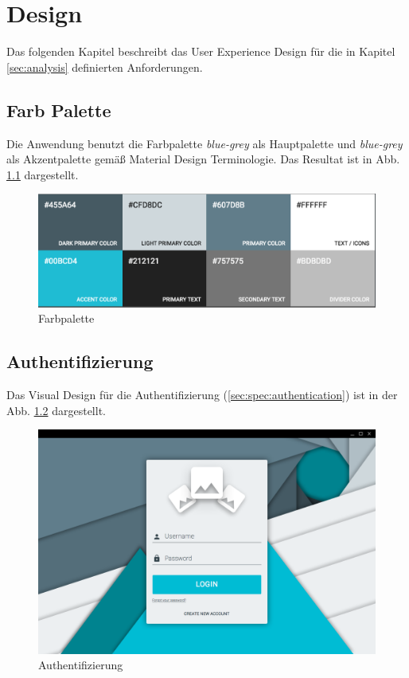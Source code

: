 \chapter{Design}

Das folgenden Kapitel beschreibt das User Experience Design für die in Kapitel \ref{sec:analysis} definierten Anforderungen.

\section{Farb Palette}

Die Anwendung benutzt die Farbpalette \textit{blue-grey} als Hauptpalette und \textit{blue-grey} als Akzentpalette gemäß Material Design Terminologie. Das Resultat ist in Abb. \ref{fig:color_palette} dargestellt.

\begin{figure}[htp]     %
\centering
\includegraphics[width=1.0\textwidth]{images/color_palette}
\caption{Farbpalette}\label{fig:color_palette}
\end{figure}

\section{Authentifizierung}

Das Visual Design für die Authentifizierung (\ref{sec:spec:authentication}) ist in der Abb. \ref{fig:login_form} dargestellt.

\begin{figure}[htp]     %
\centering
\includegraphics[width=1.0\textwidth]{images/login_form}
\caption{Authentifizierung}\label{fig:login_form}
\end{figure}


